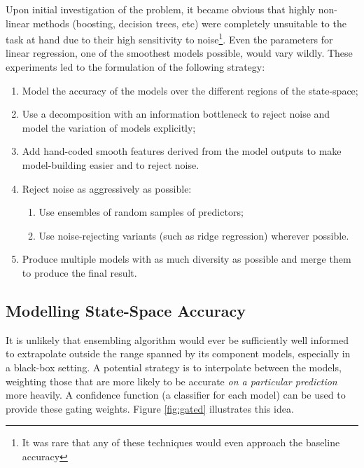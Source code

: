 \documentclass{article}
\begin{document}
Upon initial investigation of the problem, it became obvious that highly non-linear methods (boosting, decision trees, etc) were completely unsuitable to the task at hand due to their high sensitivity to noise\footnote{It was rare that any of these techniques would even approach the baseline accuracy}.  Even the parameters for linear regression, one of the smoothest models possible, would vary wildly.  These experiments led to the formulation of the following strategy:

\begin{enumerate}
\item Model the accuracy of the models over the different regions of the state-space;
\item Use a decomposition with an information bottleneck to reject noise and model the variation of models explicitly;
\item Add hand-coded smooth features derived from the model outputs to make model-building easier and to reject noise.
\item Reject noise as aggressively as possible:
  \begin{enumerate}
  \item Use ensembles of random samples of predictors;
  \item Use noise-rejecting variants (such as ridge regression) wherever possible.
    \end{enumerate}
\item Produce multiple models with as much diversity as possible and merge them to produce the final result.
\end{enumerate}


\subsection{Modelling State-Space Accuracy}
\label{sec:state-space-accuracy}

It is unlikely that ensembling algorithm would ever be sufficiently well informed to extrapolate outside the range spanned by its component models, especially in a black-box setting.  A potential strategy is to interpolate between the models, weighting those that are more likely to be accurate \emph{on a particular prediction} more heavily.  A confidence function (a classifier for each model) can be used to provide these gating weights.  Figure \ref{fig:gated} illustrates this idea.
\end{document}
